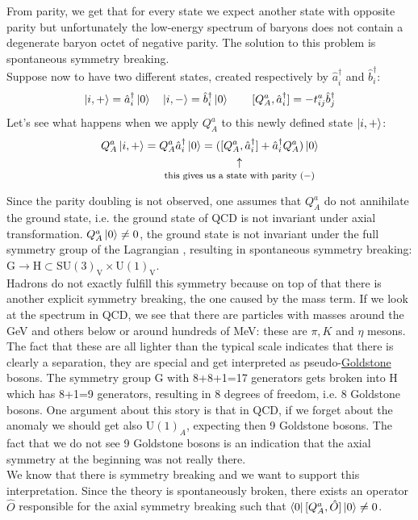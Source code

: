 \documentclass[../main.tex]{subfiles}
\begin{document}
From parity, we get that for every state we expect another state with opposite parity but unfortunately the low-energy spectrum of baryons does not contain a degenerate baryon octet of negative parity. The solution to this problem is spontaneous symmetry breaking.\\
Suppose now to have two different states, created respectively by $\hat{a}_i^\dagger$ and $\hat{b}_i^\dagger$:
\[
\ket{i,+}=\hat{a}_i^\dagger\ket{0} \quad \ket{i,-}=\hat{b}_i^\dagger\ket{0} \qquad [Q_A^a,\hat{a}_i^\dagger]=-t^a_{ij}\hat{b}_j^\dagger
\]
Let's see what happens when we apply $Q_A^a$ to this newly defined state $\ket{i,+}$:
\[
Q_A^a\ket{i,+}=Q_A^a\hat{a}_i^\dagger\ket{0}=(\underset{\mathclap{\tikz \node {$\uparrow$} node [below=1ex] {\footnotesize this gives us a state with parity $(-)$ };}}
{[Q_A^a,\hat{a}_i^\dagger]}+\hat{a}_i^\dagger Q_A^a)\ket{0}
\]
Since the parity doubling is not observed, one assumes that $Q_A^a$ do not annihilate the ground state, i.e. the ground state of QCD is not invariant under axial transformation. $Q_A^a\ket{0}\neq0$, the ground state is not invariant under the full symmetry group of the Lagrangian , resulting in spontaneous symmetry breaking: G$\to$H$\subset$SU$(3)_{\text{V}}\times$U$(1)_{\text{V}}$.\\
Hadrons do not exactly fulfill this symmetry because on top of that there is another explicit symmetry breaking, the one caused by the mass term. If we look at the spectrum in QCD, we see that there are particles with masses around the GeV and others below or around hundreds of MeV: these are $\pi, K$ and $\eta$ mesons. The fact that these are all lighter than the typical scale indicates that there is clearly a separation, they are special and get interpreted as pseudo-\href{https://en.wikipedia.org/wiki/Jeffrey_Goldstone}{Goldstone} bosons. The symmetry group G with 8+8+1=17 generators gets broken into H which has 8+1=9 generators, resulting in 8 degrees of freedom, i.e. 8 Goldstone bosons. One argument about this story is that in QCD, if we forget about the anomaly we should get also U$(1)_A$, expecting then 9 Goldstone bosons. The fact that we do not see 9 Goldstone bosons is an indication that the axial symmetry at the beginning was not really there.\\
We know that there is symmetry breaking and we want to support this interpretation. Since the theory is spontaneously broken, there exists an operator $\hat{O}$ responsible for the axial symmetry breaking such that $\bra{0}[Q_A^a,\hat{O}]\ket{0}\neq0$.\\
\end{document}
